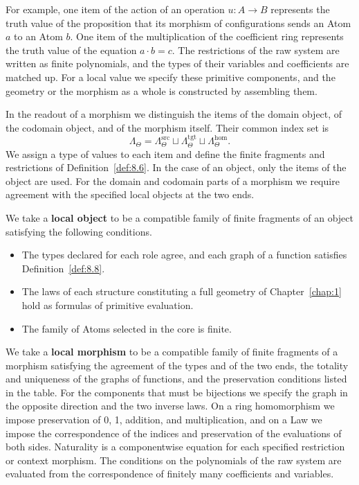 \begin{definition}
For example, one item of the action of an operation $u:A\to B$ represents the truth value of
the proposition that its morphism of configurations sends an Atom $a$ to an Atom $b$.
One item of the multiplication of the coefficient ring represents the truth value of the
equation $a\cdot b=c$.
The restrictions of the raw system are written as finite polynomials, and the types of their
variables and coefficients are matched up.
For a local value we specify these primitive components, and the geometry or the morphism as
a whole is constructed by assembling them.

In the readout of a morphism we distinguish the items of the domain object, of the codomain
object, and of the morphism itself.
Their common index set is
\begin{equation*}
\Lambda_\Theta
=
\Lambda_\Theta^{\mathrm{src}}
\sqcup
\Lambda_\Theta^{\mathrm{tgt}}
\sqcup
\Lambda_\Theta^{\mathrm{hom}}.
\tag{8.13}\label{eq:8.13}
\end{equation*}
We assign a type of values to each item and define the finite fragments and restrictions of
Definition~\ref{def:8.6}.
In the case of an object, only the items of the object are used.
For the domain and codomain parts of a morphism we require agreement with the specified local
objects at the two ends.

We take a \textbf{local object} to be a compatible family of finite fragments of an object
satisfying the following conditions.

\begin{itemize}
\item The types declared for each role agree, and each graph of a function satisfies
Definition~\ref{def:8.8}.
\item The laws of each structure constituting a full geometry of Chapter~\ref{chap:1} hold as
formulas of primitive evaluation.
\item The family of Atoms selected in the core is finite.
\end{itemize}

We take a \textbf{local morphism} to be a compatible family of finite fragments of a morphism
satisfying the agreement of the types and of the two ends, the totality and uniqueness of the
graphs of functions, and the preservation conditions listed in the table.
For the components that must be bijections we specify the graph in the opposite direction and
the two inverse laws.
On a ring homomorphism we impose preservation of 0, 1, addition, and multiplication, and on a
Law we impose the correspondence of the indices and preservation of the evaluations of both
sides.
Naturality is a componentwise equation for each specified restriction or context morphism.
The conditions on the polynomials of the raw system are evaluated from the correspondence of
finitely many coefficients and variables.


\end{definition}
